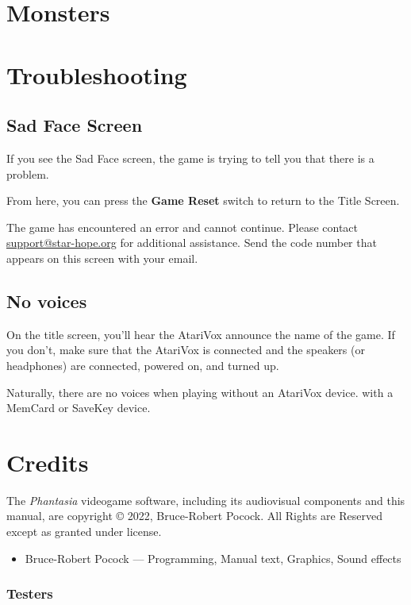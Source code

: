 \documentclass[10pt,twocolumn,openany,article]{memoir}
\begin{document}
\columnbreak
\chapter{Monsters}

\columnbreak
\chapter{Troubleshooting}

\section{Sad Face Screen}

If you  see the Sad  Face screen,  the game is  trying to tell  you that
there is a problem.

From here, you can press the \textbf{Game Reset} switch to return to the
Title Screen.

The game  has encountered an  error and cannot continue.  Please contact
\href{mailto:support@star-hope.org}{support@star-hope.org}           for
additional assistance. Send the code  number that appears on this screen
with your email.

\section{No voices}

On the title  screen, you'll hear the AtariVox announce  the name of the
game. If  you don't, make  sure that the  AtariVox is connected  and the
speakers (or headphones) are connected, powered on, and turned up.

Naturally,  there are  no  voices  when playing  \ifdefined\ATARIAGESAVE
without an AtariVox device. \else with a MemCard or SaveKey device. \fi

\pagebreak
\chapter{Credits}

{\small

  The \textit{Phantasia}  videogame software, including  its audiovisual
  components  and   this  manual,   are  copyright   \copyright{}  2022,
  Bruce-Robert  Pocock.  All  Rights  are  Reserved  except  as  granted
  under license.

\begin{itemize}
\item Bruce-Robert Pocock --- Programming, Manual text, Graphics,
  Sound effects
\end{itemize}

\bigskip


\subsection{Testers}

}

\vfill

\clearpage
{}
\end{document}
